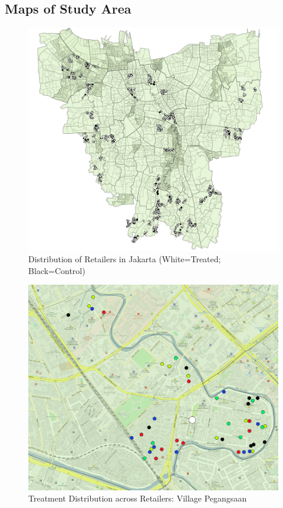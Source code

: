 \documentclass[11.5pt]{article}
\begin{document}
\clearpage{}
\begin{appendices}


\appendix


\pagebreak
\begin{landscape}
\section{Maps of Study Area} \label{sec:maps}

\begin{figure}[h!]
    \centering
    \caption{Distribution of Retailers in Jakarta (White=Treated; Black=Control)}
    \includegraphics[width=120mm]{FigmapTC.png}
\end{figure}


\begin{figure}[h!]
    \centering
    \caption{Treatment Distribution across Retailers: Village Pegangsaan}
   \includegraphics[width=120mm]{FigmapZoom.png}
\end{figure}



\end{landscape}
\end{appendices}
\end{document}
